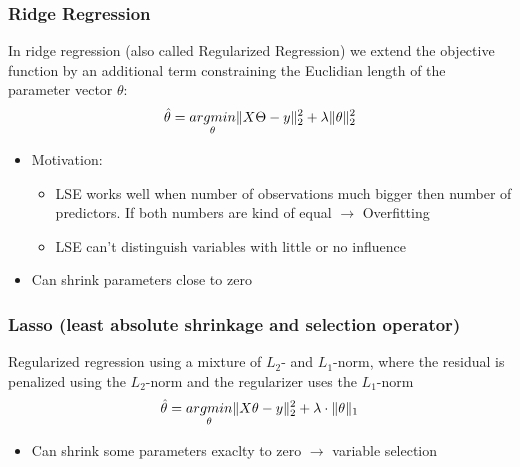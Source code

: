 \subsubsection*{Ridge Regression}
In ridge regression (also called Regularized Regression) we extend the objective function by an additional term constraining the Euclidian length of the parameter vector $\theta$:
$$ \hat{\theta} = \underset{\theta}{argmin} \lVert X\Theta - y\rVert_2^2 + \lambda \lVert\theta\rVert_2^2$$
\begin{itemize}
    \item
        Motivation: 
        \begin{itemize}
            \item 
                LSE works well when number of observations much bigger then number of predictors. If both numbers are kind of equal $\rightarrow$ Overfitting
            \item
                LSE can't distinguish variables with little or no influence
        \end{itemize}
    \item
        Can shrink parameters close to zero
\end{itemize}
\subsubsection*{Lasso (least absolute shrinkage and selection operator)}
Regularized regression using a mixture of $L_2$- and $L_1$-norm, where the residual is penalized using the $L_2$-norm and the regularizer uses the $L_1$-norm
$$ \hat{\theta} = \underset{\theta}{argmin} \lVert X\theta - y\rVert_2^2 + \lambda \cdot \lVert\theta\rVert_1$$
\begin{itemize}
    \item
        Can shrink some parameters exaclty to zero $\rightarrow$ variable selection
\end{itemize}

